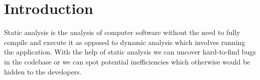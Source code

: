 \section{Introduction}
Static analysis is the analysis of computer software without the need to fully compile and execute it as opposed to dynamic analysis\cite{dynamic_analysis} which involves running the application. With the help of static analysis we can uncover hard-to-find bugs in the codebase or we can spot potential inefficiencies which otherwise would be hidden to the developers.